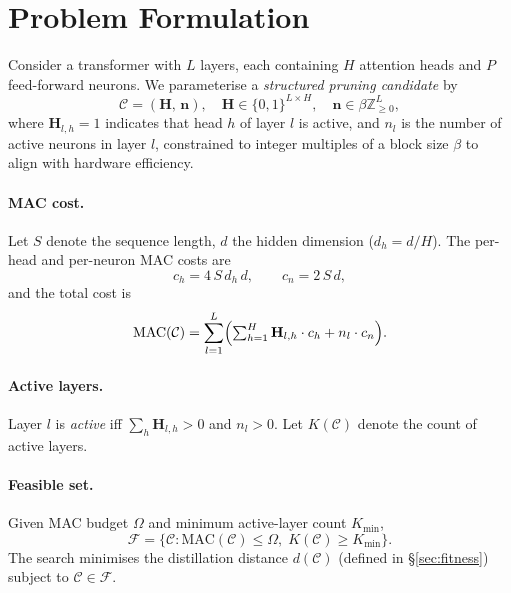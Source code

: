 \documentclass{article}
\newcommand{\Hb}{\mathbf{H}}
\newcommand{\nb}{\mathbf{n}}
\newcommand{\Cc}{\mathcal{C}}
\newcommand{\Fc}{\mathcal{F}}
\newcommand{\Zset}{\mathbb{Z}}
\newcommand{\MAC}{\mathrm{MAC}}
\begin{document}
\section{Problem Formulation}
\label{sec:problem}

Consider a transformer with $L$ layers, each containing $H$ attention
heads and $P$ feed-forward neurons.  We parameterise a \emph{structured
pruning candidate} by
\begin{equation}
  \Cc = (\Hb,\, \nb),\quad
  \Hb \in \{0,1\}^{L\times H},\quad
  \nb \in \beta\Zset_{\ge 0}^{L},
  \label{eq:candidate}
\end{equation}
where $\Hb_{l,h}=1$ indicates that head $h$ of layer $l$ is active, and
$n_l$ is the number of active neurons in layer $l$, constrained to
integer multiples of a block size $\beta$ to align with hardware
efficiency.

\paragraph{MAC cost.}
Let $S$ denote the sequence length, $d$ the hidden dimension
($d_h = d/H$).  The per-head and per-neuron MAC costs are
\begin{equation}
  c_h = 4\,S\,d_h\,d, \qquad c_n = 2\,S\,d,
  \label{eq:mac_costs}
\end{equation}
and the total cost is
\begin{equation}
  \MAC(\Cc) = \sum_{l=1}^{L}
  \Bigl(\textstyle\sum_{h=1}^{H}\Hb_{l,h}\cdot c_h
        + n_l \cdot c_n\Bigr).
  \label{eq:mac}
\end{equation}

\paragraph{Active layers.}
Layer $l$ is \emph{active} iff $\sum_h \Hb_{l,h}>0$ and $n_l>0$.
Let $K(\Cc)$ denote the count of active layers.

\paragraph{Feasible set.}
Given MAC budget $\Omega$ and minimum active-layer count $K_{\min}$,
\begin{equation}
  \Fc = \bigl\{\Cc : \MAC(\Cc)\le\Omega,\; K(\Cc)\ge K_{\min}\bigr\}.
  \label{eq:feasible}
\end{equation}
The search minimises the distillation distance $d(\Cc)$
(defined in \S\ref{sec:fitness}) subject to $\Cc\in\Fc$.
\end{document}

